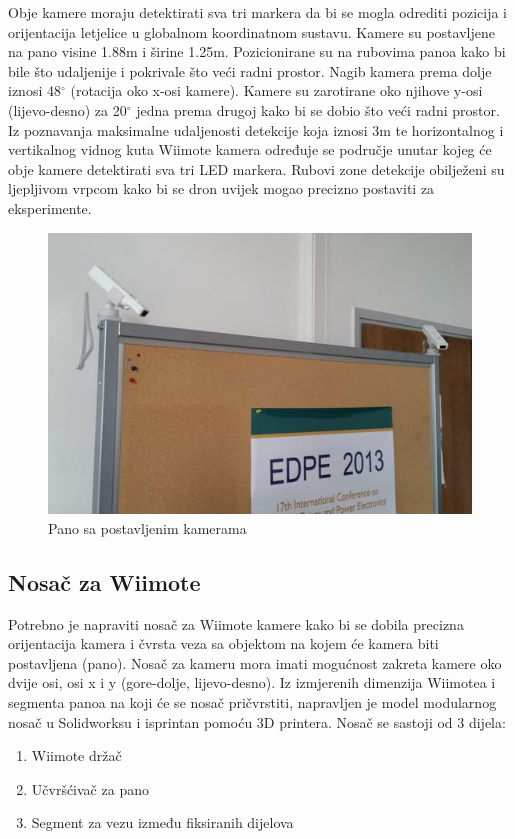 \documentclass[times, utf8, diplomski]{fer}
\begin{document}
Obje kamere moraju detektirati sva tri markera da bi se mogla odrediti pozicija i orijentacija letjelice u globalnom koordinatnom sustavu. Kamere su postavljene na pano visine 1.88m i širine 1.25m. Pozicionirane su na rubovima panoa kako bi bile što udaljenije i pokrivale što veći radni prostor. Nagib kamera prema dolje iznosi 48$^{\circ}$ (rotacija oko x-osi kamere). Kamere su zarotirane oko njihove y-osi (lijevo-desno) za 20$^{\circ}$ jedna prema drugoj kako bi se dobio što veći radni prostor. Iz poznavanja maksimalne udaljenosti detekcije koja iznosi 3m te horizontalnog i vertikalnog vidnog kuta Wiimote kamera određuje se područje unutar kojeg će obje kamere detektirati sva tri LED markera. Rubovi zone detekcije obilježeni su ljepljivom vrpcom kako bi se dron uvijek mogao precizno postaviti za eksperimente.

\begin{figure}[h]
\centering
\includegraphics[width=.7\textwidth]{kamere}
\caption{Pano sa postavljenim kamerama}
\label{fig:kamere_pano}
\end{figure} 

\subsection{Nosač za Wiimote}
Potrebno je napraviti nosač za Wiimote kamere kako bi se dobila precizna orijentacija kamera i čvrsta veza sa objektom na kojem će kamera biti postavljena (pano). Nosač za kameru mora imati mogućnost zakreta kamere oko dvije osi, osi x i y (gore-dolje, lijevo-desno). Iz izmjerenih dimenzija Wiimotea i segmenta panoa na koji će se nosač pričvrstiti, napravljen je model modularnog nosač u Solidworksu i isprintan pomoću 3D printera. Nosač se sastoji od 3 dijela:

\begin{enumerate}
	\item Wiimote držač
	\item Učvršćivač za pano
	\item Segment za vezu između fiksiranih dijelova 
\end{enumerate}
\end{document}
